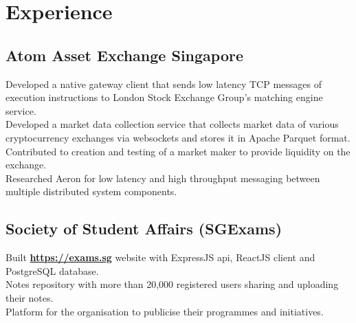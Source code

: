 \documentclass[a4paper,hidelinks]{resume} %
\begin{document}
\begin{minipage}[t]{0.54\textwidth} %

    
    \section{Experience}
    
    \sectionspace %
    
    \subsection{Atom Asset Exchange Singapore}
    
    \textbullet{} Developed a native gateway client that sends low latency TCP messages of execution instructions to London Stock Exchange Group’s matching engine service. \\
    \textbullet{} Developed a market data collection service that collects market data of various cryptocurrency exchanges via websockets and stores it in Apache Parquet format. \\
    \textbullet{} Contributed to creation and testing of a market maker to provide liquidity on the exchange. \\
    \textbullet{} Researched Aeron for low latency and high throughput messaging between multiple distributed system components. \\
    
    \sectionspace %
    
    
    \subsection{Society of Student Affairs (SGExams)}
    
    \textbullet{} Built \href{https://exams.sg}{\bf https://exams.sg} website with ExpressJS api, ReactJS client and PostgreSQL database. \\
    \textbullet{} Notes repository with more than 20,000 registered users sharing and uploading their notes. \\
    \textbullet{} Platform for the organisation to publicise their programmes and initiatives. \\
    

\end{minipage}
\end{document}
